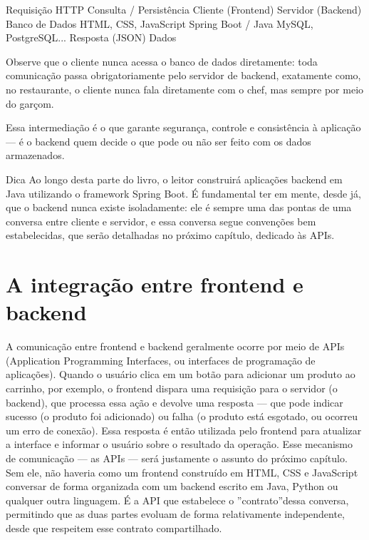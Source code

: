 \begin{infobox}{Requisição HTTP                   Consulta / Persistência}
Cliente (Frontend) Servidor (Backend) Banco de Dados HTML, CSS, JavaScript Spring Boot / Java MySQL, PostgreSQL... Resposta (JSON) Dados
\end{infobox}

Observe que o cliente nunca acessa o banco de dados diretamente: toda comunicação passa obrigatoriamente pelo servidor de backend, exatamente como, no restaurante, o cliente nunca fala diretamente com o chef, mas sempre por meio do garçom.

Essa intermediação é o que garante segurança, controle e consistência à aplicação — é o backend quem decide o que pode ou não ser feito com os dados armazenados.

\begin{infobox}{Dica}
Ao longo desta parte do livro, o leitor construirá aplicações backend em Java utilizando o framework Spring Boot. É fundamental ter em mente, desde já, que o backend nunca existe isoladamente: ele é sempre uma das pontas de uma conversa entre cliente e servidor, e essa conversa segue convenções bem estabelecidas, que serão detalhadas no próximo capítulo, dedicado às APIs.
\end{infobox}

\section{A integração entre frontend e backend}

A comunicação entre frontend e backend geralmente ocorre por meio de APIs (Application Programming Interfaces, ou interfaces de programação de aplicações). Quando o usuário clica em um botão para adicionar um produto ao carrinho, por exemplo, o frontend dispara uma requisição para o servidor (o backend), que processa essa ação e devolve uma resposta — que pode indicar sucesso (o produto foi adicionado) ou falha (o produto está esgotado, ou ocorreu um erro de conexão). Essa resposta é então utilizada pelo frontend para atualizar a interface e informar o usuário sobre o resultado da operação. Esse mecanismo de comunicação — as APIs — será justamente o assunto do próximo capítulo. Sem ele, não haveria como um frontend construído em HTML, CSS e JavaScript conversar de forma organizada com um backend escrito em Java, Python ou qualquer outra linguagem. É a API que estabelece o ”contrato”dessa conversa, permitindo que as duas partes evoluam de forma relativamente independente, desde que respeitem esse contrato compartilhado.

